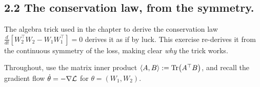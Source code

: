 
\subsection*{2.2 The conservation law, from the symmetry.}
The algebra trick used in the chapter to derive the conservation law $\frac{d}{dt}[W_2^\top W_2 - W_1 W_1^\top] = 0$ derives it as if by
luck. This exercise re-derives it from the continuous
symmetry of the loss, making clear \emph{why} the trick works.

Throughout, use the matrix inner product $\langle A, B\rangle := \Tr(A^\top B)$,
and recall the gradient flow $\dot\theta = -\nabla\mathcal{L}$ for $\theta = (W_1, W_2)$.

